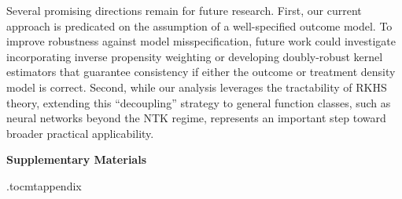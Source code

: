 \documentclass[english,11pt]{article}
\begin{document}
Several promising directions remain for future research. First, our current approach is predicated on the assumption of a well-specified outcome model. To improve robustness against model misspecification, future work could investigate incorporating inverse propensity weighting or developing doubly-robust kernel estimators that guarantee consistency if either the outcome or treatment density model is correct.
Second, while our analysis leverages the tractability of RKHS theory, extending this ``decoupling'' strategy to general function classes, such as neural networks beyond the NTK regime, represents an important step toward broader practical applicability.


\clearpage
\newpage
{


}





\clearpage
\newpage
\appendix
\begin{center}
\textbf{{\Huge Supplementary Materials}}
\end{center}
\vspace{0.5cm}
\etocdepthtag.toc{mtappendix}
{\tableofcontents}



\end{document}

